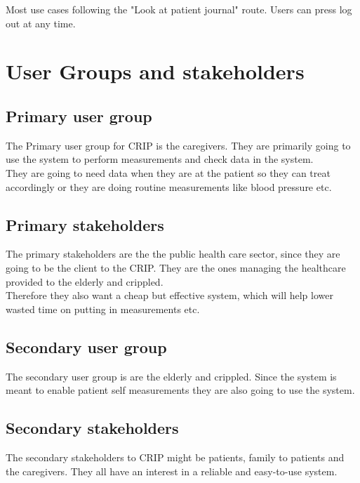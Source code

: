 Most use cases following the "Look at patient journal" route. Users can press log out at any time. 


\section{User Groups and stakeholders}
\subsection{Primary user group}
The Primary user group for CRIP is the caregivers. They are primarily going to use the system to perform measurements and check data in the system.\\
They are going to need data when they are at the patient so they can treat accordingly or they are doing routine measurements like blood pressure etc.\\


\subsection{Primary stakeholders}
The primary stakeholders are the the public health care sector, since they are going to be the client to the CRIP. They are the ones managing the healthcare provided to the elderly and crippled.\\
Therefore they also want a cheap but effective system, which will help lower wasted time on putting in measurements etc.\\

\subsection{Secondary user group}
The secondary user group is are the elderly and crippled. Since the system is meant to enable patient self measurements they are also going to use the system.\\


\subsection{Secondary stakeholders}
The secondary stakeholders to CRIP might be patients, family to patients and the caregivers. They all have an interest in a reliable and easy-to-use system.\\
